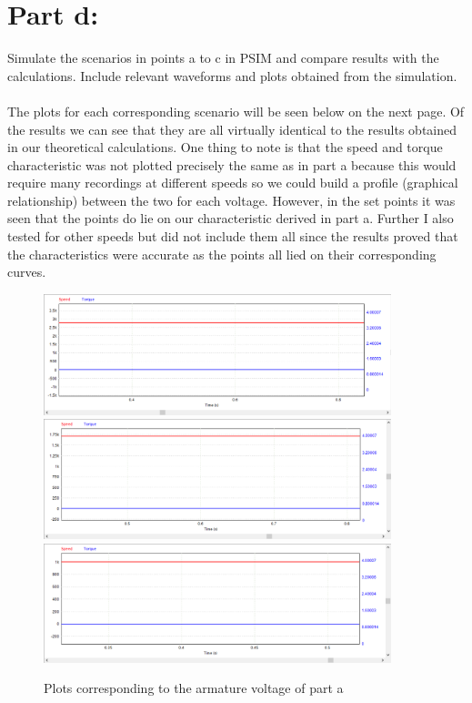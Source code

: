 \documentclass{article}
\begin{document}
\section*{Part d:}
Simulate the scenarios in points a to c in PSIM and compare results with the calculations. Include relevant waveforms and plots obtained from the simulation.\\ \\
The plots for each corresponding scenario will be seen below on the next page. Of the results we can see that they are all virtually identical to the results obtained in our theoretical calculations. One thing to note is that the speed and torque characteristic was not plotted precisely the same as in part a because this would require many recordings at different speeds so we could build a profile (graphical relationship) between the two for each voltage. However, in the set points it was seen that the points do lie on our characteristic derived in part a. Further I also tested for other speeds but did not include them all since the results proved that the characteristics were accurate as the points all lied on their corresponding curves.
\begin{figure}[H]
    \centering
    \includegraphics[width=0.9\textwidth]{q1-d-120.png}
    \includegraphics[width=0.9\textwidth]{q1-d-75.png}
    \includegraphics[width=0.9\textwidth]{q1-d-45.png}
    \caption{Plots corresponding to the armature voltage of part a}
\end{figure}
\end{document}
